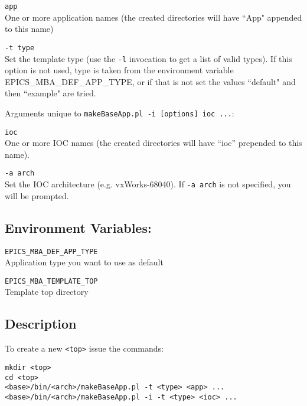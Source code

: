 \begin{description}
\item \verb|app| \\
One or more application names (the created directories will have ``App" appended to this name)

\item \verb|-t type| \\
Set the template type (use the \verb|-l| invocation to get a list of valid types).
If this option is not used, type is taken from the environment variable EPICS\_MBA\_DEF\_APP\_TYPE, or if that is not set the values ``default" and then ``example" are tried.
\end{description}

Arguments unique to \verb|makeBaseApp.pl -i [options] ioc ...|:

\begin{description}
\item \verb|ioc| \\
One or more IOC names (the created directories will have ``ioc'' prepended to this name).

\item \verb|-a arch| \\
Set the IOC architecture (e.g. vxWorks-68040).
If \verb|-a arch| is not specified, you will be prompted.
\end{description}

\subsection{Environment Variables:}

\begin{description}
\item \verb|EPICS_MBA_DEF_APP_TYPE| \\
Application type you want to use as default

\item \verb|EPICS_MBA_TEMPLATE_TOP| \\
Template top directory
\end{description}

\subsection{Description}

To create a new \verb|<top>| issue the commands:

\begin{verbatim}
mkdir <top>
cd <top>
<base>/bin/<arch>/makeBaseApp.pl -t <type> <app> ... 
<base>/bin/<arch>/makeBaseApp.pl -i -t <type> <ioc> ...
\end{verbatim}

